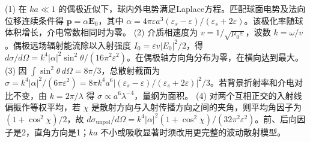 (1) 在 \(ka\ll1\) 的偶极近似下，球内外电势满足Laplace方程。匹配球面电势及法向位移连续条件得 \(\mathbf p=\alpha\mathbf E_0\)，其中 \(\alpha=4\pi\varepsilon a^3(\varepsilon_s-\varepsilon)/(\varepsilon_s+2\varepsilon)\)。该极化率随球体积增长，介电常数相同时为零。
(2) 介质相速度为 \(v=1/\sqrt{\mu_0\varepsilon}\)，波数 \(k=\omega/v\)。偶极远场辐射能流除以入射强度 \(I_0=\varepsilon v|E_0|^2/2\)，得 \(d\sigma/d\Omega=k^4|\alpha|^2\sin^2\theta/(16\pi^2\varepsilon^2)\)。在偶极轴方向角分布为零，在横向达到最大。
(3) 因 \(\int\sin^2\theta\,d\Omega=8\pi/3\)，总散射截面为 \(\sigma=k^4|\alpha|^2/(6\pi\varepsilon^2)=8\pi k^4a^6|(\varepsilon_s-\varepsilon)/(\varepsilon_s+2\varepsilon)|^2/3\)。若背景折射率和介电对比不变，由 \(k=2\pi/\lambda\) 得 \(\sigma\propto a^6\lambda^{-4}\)，量纲为面积。
(4) 对两个互相正交的入射线偏振作等权平均，若 \(\chi\) 是散射方向与入射传播方向之间的夹角，则平均角因子为 \((1+\cos^2\chi)/2\)，故 \(d\sigma_{\mathrm{unpol}}/d\Omega=k^4|\alpha|^2(1+\cos^2\chi)/(32\pi^2\varepsilon^2)\)。前、后向因子是2，直角方向是1；\(ka\) 不小或吸收显著时须改用更完整的波动散射模型。
